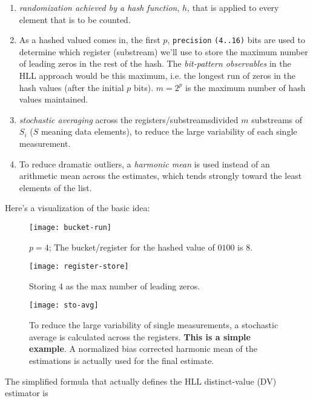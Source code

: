 \documentclass[12pt]{article}
\begin{document}
\begin{enumerate}
\item \textit{randomization achieved by a hash function}, $h$, that is applied
  to every element that is to be counted.
\item As a hashed valued comes in, the first $p$, \texttt{precision}
  \texttt{(4..16)} bits are used to determine which register (substream)
  we'll use to store the maximum number of leading zeros in the rest of the
  hash. The \textit{bit-pattern observables} in the HLL approach would be this
  maximum, i.e. the longest run of zeros in the hash values (after the initial
  $p$ bits). $m = 2^p$ is the maximum number of hash values maintained.
\item \textit{stochastic averaging} across the
  registers/substreams\textemdash divided $m$ substreams of $S_i$
  ($S$ meaning data elements), to reduce the large variability of each single
  measurement.
\item To reduce dramatic outliers, a \textit{harmonic mean} is used instead of
  an arithmetic mean across the estimates, which tends strongly toward the
  least elements of the list\cite{Harmonic-mean:Online}.
\end{enumerate}

Here's a visualization of the basic idea\cite{Kiip:Online}:

\begin{figure}[H]
\centering
\texttt{[image: bucket-run]}
\caption{$p=4$; The bucket/register for the hashed value of $0100$ is $8$.}
\label{figurebucketrun}
\end{figure}

\begin{figure}[H]
\centering
\texttt{[image: register-store]}
\caption{Storing 4 as the max number of leading zeros.}
\label{figurestoreregister}
\end{figure}

\begin{figure}[H]
\centering
\texttt{[image: sto-avg]}
\caption{To reduce the large variability of single measurements, a stochastic
  average is calculated across the registers. \textbf{This is a simple example}.
  A normalized bias corrected harmonic mean of the estimations is actually used
  for the final estimate.}
\label{figurestoaverage}
\end{figure}

The simplified formula that actually defines the HLL distinct-value (DV)
estimator\cite{Neustar:Online} is
\end{document}
